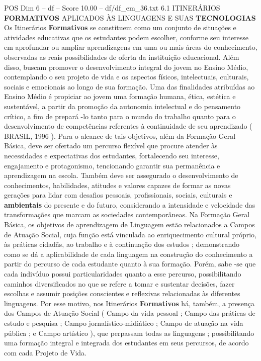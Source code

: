 \begin{textsample}{POS Dim 6 – df – Score 10.00 – df/df\_em\_36.txt}  \label{ex:f6_pos_123}
6.1 ITINERÁRIOS \textbf{FORMATIVOS} APLICADOS ÀS LINGUAGENS E SUAS \textbf{TECNOLOGIAS} Os Itinerários \textbf{Formativos} se constituem como um conjunto de situações e atividades educativas que os estudantes podem escolher, conforme seu interesse em aprofundar ou ampliar aprendizagens em uma ou mais áreas do conhecimento, observadas as reais possibilidades de oferta da instituição educacional.
Além disso, buscam promover o desenvolvimento integral do jovem no Ensino Médio, contemplando o seu projeto de vida e os aspectos físicos, intelectuais, culturais, sociais e emocionais ao longo de sua formação.
Uma das finalidades atribuídas ao Ensino Médio é propiciar ao jovem uma formação humana, ética, estética e sustentável, a partir da promoção da autonomia intelectual e do pensamento crítico, a fim de prepará -lo tanto para o mundo do trabalho quanto para o desenvolvimento de competências referentes à continuidade de seu aprendizado ( BRASIL, 1996 ).
Para o alcance de tais objetivos, além da Formação Geral Básica, deve ser ofertado um percurso flexível que procure atender às necessidades e expectativas dos estudantes, fortalecendo seu interesse, engajamento e protagonismo, tencionando garantir sua permanência e aprendizagem na escola.
Também deve ser assegurado o desenvolvimento de conhecimentos, habilidades, atitudes e valores capazes de formar as novas gerações para lidar com desafios pessoais, profissionais, sociais, culturais e \textbf{ambientais} do presente e do futuro, considerando a intensidade e velocidade das transformações que marcam as sociedades contemporâneas.
Na Formação Geral Básica, os objetivos de aprendizagem de Linguagem estão relacionados a Campos de Atuação Social, cuja função está vinculada ao enriquecimento cultural próprio, às práticas cidadãs, ao trabalho e à continuação dos estudos ; demonstrando como se dá a aplicabilidade de cada linguagem na construção do conhecimento a partir do percurso de cada estudante quanto à sua formação.
Porém, sabe -se que cada indivíduo possui particularidades quanto a esse percurso, possibilitando caminhos diversificados no que se refere a tomar e sustentar decisões, fazer escolhas e assumir posições conscientes e reflexivas relacionadas às diferentes linguagens.
Por esse motivo, nos Itinerários \textbf{Formativos} há, também, a presença dos Campos de Atuação Social ( Campo da vida pessoal ; Campo das práticas de estudo e pesquisa ; Campo jornalístico-midiático ; Campo de atuação na vida pública ; e Campo artístico ), que perpassam todas as linguagens ; possibilitando uma formação integral e integrada dos estudantes em seus percursos, de acordo com cada Projeto de Vida.

\end{textsample}
